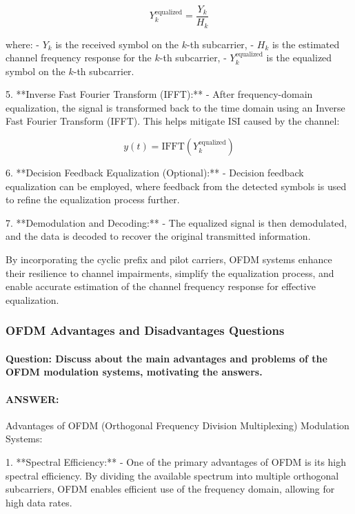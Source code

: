 \documentclass[colorlinks,11pt,a4paper,normalphoto,withhyper,ragged2e]{altareport}
\begin{document}
				\[ Y_k^{\text{equalized}} = \frac{Y_k}{H_k} \]
				
				where:
				- \( Y_k \) is the received symbol on the \(k\)-th subcarrier,
				- \( H_k \) is the estimated channel frequency response for the \(k\)-th subcarrier,
				- \( Y_k^{\text{equalized}} \) is the equalized symbol on the \(k\)-th subcarrier.
				
				5. **Inverse Fast Fourier Transform (IFFT):**
				- After frequency-domain equalization, the signal is transformed back to the time domain using an Inverse Fast Fourier Transform (IFFT). This helps mitigate ISI caused by the channel:
				
				\[ y(t) = \text{IFFT}(Y_k^{\text{equalized}}) \]
				
				6. **Decision Feedback Equalization (Optional):**
				- Decision feedback equalization can be employed, where feedback from the detected symbols is used to refine the equalization process further.
				
				7. **Demodulation and Decoding:**
				- The equalized signal is then demodulated, and the data is decoded to recover the original transmitted information.
				
				By incorporating the cyclic prefix and pilot carriers, OFDM systems enhance their resilience to channel impairments, simplify the equalization process, and enable accurate estimation of the channel frequency response for effective equalization.
				
				
				
				
				
			\subsubsection{OFDM Advantages and Disadvantages Questions}
				\paragraph{Question: Discuss about the main advantages and problems of the OFDM modulation systems, motivating the answers.}
				\paragraph{ANSWER:}
				
				Advantages of OFDM (Orthogonal Frequency Division Multiplexing) Modulation Systems:
				
				1. **Spectral Efficiency:**
				- One of the primary advantages of OFDM is its high spectral efficiency. By dividing the available spectrum into multiple orthogonal subcarriers, OFDM enables efficient use of the frequency domain, allowing for high data rates.
				
\end{document}
